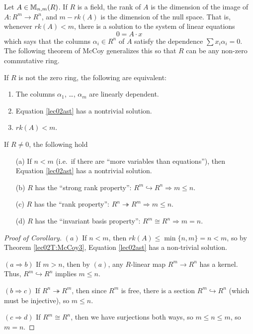  \setcounter{lecture}{2}

 Let $A\in \mathbb{M}_{n,m}(R)$. If $R$ is a field, the rank of $A$ is the dimension of the
 image of $A:R^m\to R^n$, and $m-rk(A)$ is the dimension of the null space. That
 is, whenever $rk(A)< m$, there is a solution to the system of linear equations
 \begin{equation}
 0 = A\cdot x \label{lec02ast}
 \end{equation}
 which says that the columns $\alpha_i\in R^n$ of $A$ satisfy the dependence $\sum
 x_i\alpha_i=0$. The following theorem of McCoy generalizes this so that $R$ can be any
 non-zero commutative ring.
 \begin{theorem}[McCoy]\label{lec02T:McCoy3}
   If $R$ is not the zero ring, the following are equivalent:
   \begin{enumerate}
     \item The columns $\alpha_1$, \dots, $\alpha_m$ are linearly dependent.
     \item Equation \ref{lec02ast} has a nontrivial solution.
     \item $rk(A)<m$.
   \end{enumerate}
 \end{theorem}
 \begin{corollary}
   If $R\ne 0$, the following hold
   \begin{enumerate}
     \item[(a)] If $n<m$ (i.e.\ if there are ``more variables than equations''), then
      Equation \ref{lec02ast} has a nontrivial solution.
     \item[(b)] $R$ has the ``strong rank property'':
        $R^m\hookrightarrow R^n \Longrightarrow m\le n$.
     \item[(c)] $R$ has the ``rank property'':
        $R^n\twoheadrightarrow R^m \Longrightarrow m\le n$.
     \item[(d)] $R$ has the ``invariant basis property'':
        $R^m\cong R^n \Longrightarrow m=n$.
   \end{enumerate}
 \end{corollary}
 \begin{proof}[Proof of Corollary]
   $(a)$ If $n<m$, then $rk(A)\le \min\{n,m\} =n< m$, so by Theorem \ref{lec02T:McCoy3},
   Equation \ref{lec02ast} has a non-trivial solution.

   $(a\Rightarrow b)$ If $m>n$, then by $(a)$, any $R$-linear map $R^m\to R^n$
   has a kernel. Thus, $R^m\hookrightarrow R^n$ implies $m\le n$.

   $(b\Rightarrow c)$ If $R^n\twoheadrightarrow R^m$, then since $R^m$ is free,
   there is a section $R^m\hookrightarrow R^n$ (which must be injective), so $m\le n$.

   $(c\Rightarrow d)$ If $R^m\cong R^n$, then we have surjections both ways, so
   $m\le n\le m$, so $m=n$.
 \end{proof}
